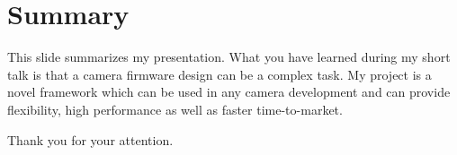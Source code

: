 \documentclass[10pt,a4paper]{article}
\begin{document}
\section{Summary}
This slide summarizes my presentation. What you have learned during my short talk is that a camera firmware design can be a complex task. My project is a novel framework which can be used in any camera development and can provide flexibility, high performance as well as faster time-to-market. 

Thank you for your attention.
\end{document}
